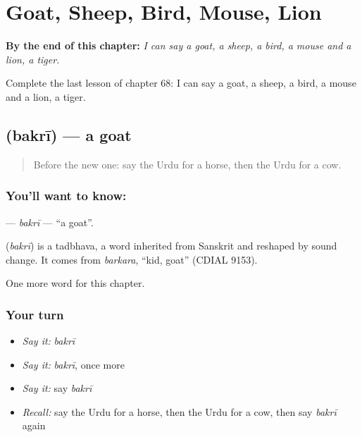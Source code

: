 
\chapter{Goat, Sheep, Bird, Mouse, Lion}
\label{ch:ur-goat-sheep-bird-mouse-lion}

\begin{chapteropening}
\textbf{By the end of this chapter:} \emph{I can say a goat, a sheep, a bird, a mouse and a lion, a tiger.}

Complete the last lesson of chapter 68: I can say a goat, a sheep, a bird, a mouse and a lion, a tiger.
\end{chapteropening}

\section[\texorpdfstring{\ur{بکری} (bakrī)}{بکری (bakrī)}]{ (bakrī) — a goat}

\label{lesson:UR-C68-bakri}



\begin{quote}
Before the new one: say the Urdu for a horse, then the Urdu for a cow.
\end{quote}

\subsection*{You'll want to know: }
\textbf{} — \emph{bakrī} — \textquotedblleft{}a goat\textquotedblright{}.

\begin{cousinweb}
\textbf{} (\emph{bakrī}) is a tadbhava, a word inherited from Sanskrit and reshaped by sound change. It comes from \emph{barkara}, \textquotedblleft{}kid, goat\textquotedblright{} (CDIAL 9153).
\end{cousinweb}

\begin{grammarlens}[title={What you've built}]
One more word for this chapter.
\end{grammarlens}

\subsection*{Your turn}
\begin{itemize}
\raggedright
  \item \emph{Say it:} \emph{bakrī}
  \item \emph{Say it:} \emph{bakrī}, once more
  \item \emph{Say it:} say \emph{bakrī}
  \item \emph{Recall:} say the Urdu for a horse, then the Urdu for a cow, then say \emph{bakrī} again
\end{itemize}

